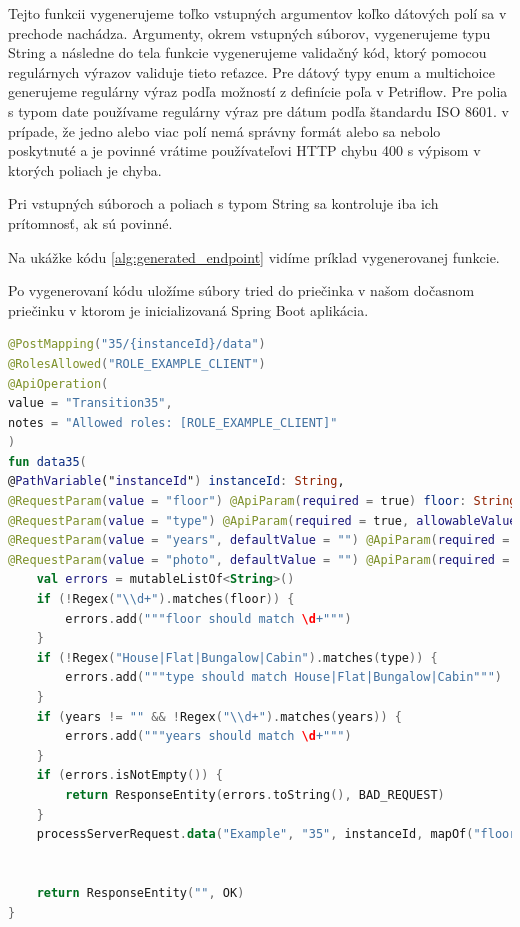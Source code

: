 Tejto funkcii vygenerujeme toľko vstupných argumentov koľko dátových polí sa v prechode nachádza. Argumenty, okrem vstupných súborov, vygenerujeme typu String a následne do tela funkcie vygenerujeme validačný kód, ktorý pomocou regulárnych výrazov validuje tieto reťazce. Pre dátový typy enum a multichoice generujeme regulárny výraz podľa možností z definície poľa v Petriflow. Pre polia s typom date používame regulárny výraz pre dátum podľa štandardu ISO 8601. v prípade, že jedno alebo viac polí nemá správny formát alebo sa nebolo poskytnuté a je povinné vrátime používateľovi HTTP chybu 400 s výpisom v ktorých poliach je chyba.

Pri vstupných súboroch a poliach s typom String sa kontroluje iba ich prítomnosť, ak sú povinné.

Na ukážke kódu \ref{alg:generated_endpoint} vidíme príklad vygenerovanej funkcie.

Po vygenerovaní kódu uložíme súbory tried do priečinka v našom dočasnom priečinku v ktorom je inicializovaná Spring Boot aplikácia.

\begin{lstlisting}[float, caption={Príklad vygenerovanej funkcie},label={alg:generated_endpoint},language=Kotlin]
@PostMapping("35/{instanceId}/data")
@RolesAllowed("ROLE_EXAMPLE_CLIENT")
@ApiOperation(
value = "Transition35",
notes = "Allowed roles: [ROLE_EXAMPLE_CLIENT]"
)
fun data35(
@PathVariable("instanceId") instanceId: String,
@RequestParam(value = "floor") @ApiParam(required = true) floor: String,
@RequestParam(value = "type") @ApiParam(required = true, allowableValues = """[House, Flat, Bungalow, Cabin]""") type: String,
@RequestParam(value = "years", defaultValue = "") @ApiParam(required = false) years: String,
@RequestParam(value = "photo", defaultValue = "") @ApiParam(required = false) photo: MultipartFile ): ResponseEntity<String> {
	val errors = mutableListOf<String>()
	if (!Regex("\\d+").matches(floor)) {
		errors.add("""floor should match \d+""")
	}
	if (!Regex("House|Flat|Bungalow|Cabin").matches(type)) {
		errors.add("""type should match House|Flat|Bungalow|Cabin""")
	}
	if (years != "" && !Regex("\\d+").matches(years)) {
		errors.add("""years should match \d+""")
	}
	if (errors.isNotEmpty()) {
		return ResponseEntity(errors.toString(), BAD_REQUEST)
	}
	processServerRequest.data("Example", "35", instanceId, mapOf("floor" to floor, "type" to type, "years" to years, "photo" to photo ))
	

	return ResponseEntity("", OK)
}
\end{lstlisting}

